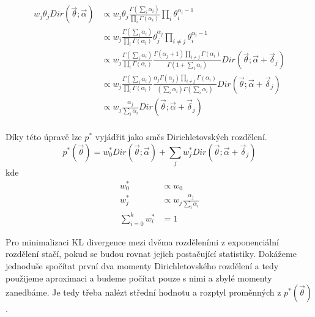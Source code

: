 \begin{align}
w_j \theta_j Dir(\vec{\theta}; \vec{\alpha}) &\propto
    w_j \theta_j \frac{\Gamma (\sum_i \alpha_{i})}{\prod_i \Gamma(\alpha_i)}
    \prod_i \theta_{i}^{\alpha_{i} - 1}
\label{eq:4}
\\
&\propto w_j \frac{\Gamma (\sum_i \alpha_{i})} {\prod_i
    \Gamma(\alpha_{i})} \theta_j^{\alpha_j} \prod_{i \ne j}
    \theta_{i}^{\alpha_{i} - 1} \\
&\propto w_j
    \frac{\Gamma (\sum_i \alpha_{i})}
         {\prod_i \Gamma(\alpha_{i})}
    \frac{\Gamma(\alpha_{j} + 1) \prod_{i \ne j} \Gamma(\alpha_i)}
         {\Gamma (1 + \sum_i \alpha_i)}
    Dir(\vec\theta; \vec{\alpha} + \vec{\delta}_j) \\
&\propto w_j
    \frac{\Gamma (\sum_i \alpha_{i})}
         {\prod_i \Gamma(\alpha_{i})}
    \frac{\alpha_j \Gamma(\alpha_j) \prod_{i \ne j} \Gamma(\alpha_i)}
         {(\sum_i \alpha_i) \Gamma (\sum_i \alpha_i)}
    Dir(\vec\theta; \vec{\alpha} + \vec{\delta}_j) \\
&\propto w_j
    \frac{\alpha_j}
         {\sum_i \alpha_i}
    Dir(\vec\theta; \vec{\alpha} + \vec{\delta}_j) \\
\end{align}

Díky této úpravě lze $p^*$ vyjádřit jako směs Dirichletovských rozdělení.
\begin{equation}
p^*(\vec{\theta}) =
    w_0^* Dir(\vec{\theta}; \vec{\alpha}) +
    \sum_j w^*_j
        Dir(\vec{\theta}; \vec{\alpha} + \vec{\delta}_j)
\label{eq:marginaltheta}
\end{equation}
kde
\begin{align}
    w^*_0 &\propto w_0 \\
    w^*_j &\propto w_j \frac{\alpha_j}{\sum_i \alpha_i} \\
    \sum_{i=0}^k w_i^* &= 1
\end{align}

Pro minimalizaci KL divergence mezi dvěma rozděleními z exponenciální rozdělení
stačí, pokud se budou rovnat jejich postačující statistiky. Dokážeme jednoduše
spočítat první dva momenty Dirichletovského rozdělení a tedy použijeme
aproximaci a budeme počítat pouze s nimi a zbylé momenty zanedbáme.
Je tedy třeba nalézt střední hodnotu a rozptyl proměnných z $p^*(\vec\theta)$.


